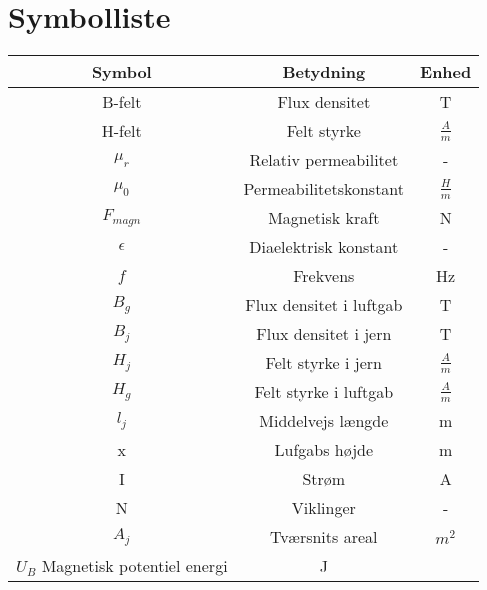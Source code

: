 \section{Symbolliste}

\begin{tabular}{|c|c|c|}
\hline 
Symbol & Betydning & Enhed \\ 
\hline 
B-felt & Flux densitet & T \\ 
\hline 
H-felt & Felt styrke & $\frac{A}{m}$\\
\hline 
$\mu_{r}$ & Relativ permeabilitet & - \\
\hline 
$\mu_{0}$ & Permeabilitetskonstant & $\frac{H}{m}$\\
\hline 
$F_{magn}$ & Magnetisk kraft & N \\
\hline
$\epsilon$ & Diaelektrisk konstant & - \\
\hline
$f$ & Frekvens & Hz \\
\hline
$B_{g}$ & Flux densitet i luftgab  & T \\
\hline
$ B_{j}$ & Flux densitet i jern & T \\
\hline
$ H_{j} $ & Felt styrke i jern & $\frac{A}{m}$ \\
\hline
$ H_{g} $ & Felt styrke i luftgab & $\frac{A}{m}$ \\
\hline
$ l_{j} $ & Middelvejs længde & m \\
\hline
x & Lufgabs højde	& m \\
\hline
I & Strøm & A \\
\hline
N & Viklinger & - \\
\hline
$ A_{j} $ & Tværsnits areal & $ m^2 $ \\
\hline
$ U_{B} $ Magnetisk potentiel energi & J \\
\hline
\end{tabular} 
